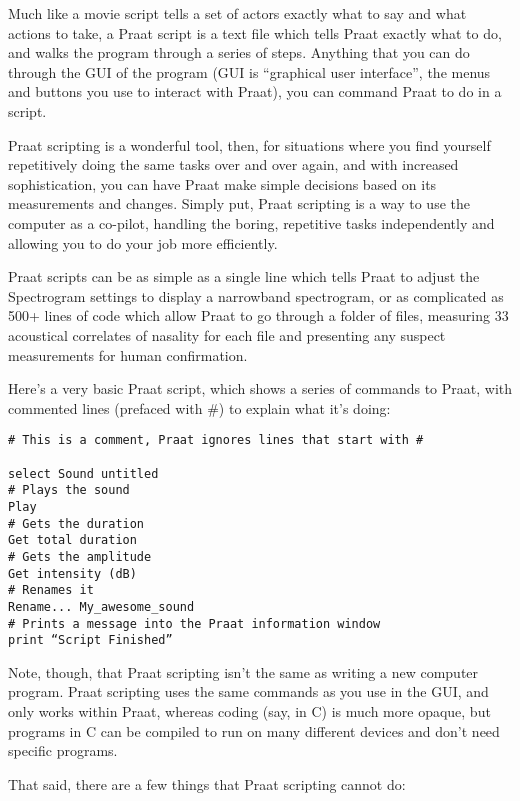Much like a movie script tells a set of actors exactly what to say and
what actions to take, a Praat script is a text file which tells Praat
exactly what to do, and walks the program through a series of steps.
Anything that you can do through the GUI of the program (GUI is
``graphical user interface'', the menus and buttons you use to interact
with Praat), you can command Praat to do in a script.

Praat scripting is a wonderful tool, then, for situations where you find
yourself repetitively doing the same tasks over and over again, and with
increased sophistication, you can have Praat make simple decisions based
on its measurements and changes. Simply put, Praat scripting is a way to
use the computer as a co-pilot, handling the boring, repetitive tasks
independently and allowing you to do your job more efficiently.

Praat scripts can be as simple as a single line which tells Praat to
adjust the Spectrogram settings to display a narrowband spectrogram, or
as complicated as 500+ lines of code which allow Praat to go through a
folder of files, measuring 33 acoustical correlates of nasality for each
file and presenting any suspect measurements for human confirmation.

Here's a very basic Praat script, which shows a series of commands to
Praat, with commented lines (prefaced with \#) to explain what it's
doing:

\begin{verbatim}
# This is a comment, Praat ignores lines that start with #

select Sound untitled
# Plays the sound
Play
# Gets the duration
Get total duration
# Gets the amplitude
Get intensity (dB)
# Renames it
Rename... My_awesome_sound
# Prints a message into the Praat information window
print “Script Finished”
\end{verbatim}

Note, though, that Praat scripting isn't the same as writing a new
computer program. Praat scripting uses the same commands as you use in
the GUI, and only works within Praat, whereas coding (say, in C) is much
more opaque, but programs in C can be compiled to run on many different
devices and don't need specific programs.

That said, there are a few things that Praat scripting cannot do:


